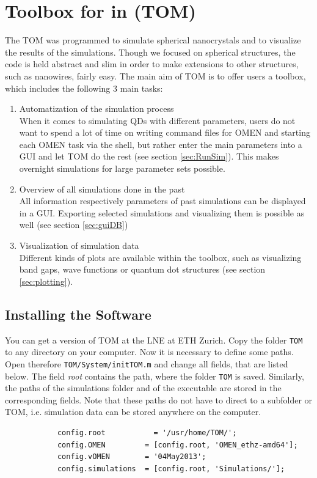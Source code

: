 \chapter{Toolbox for \omen in \matlab (TOM)}

	The \gls{TOM} was programmed to simulate spherical nanocrystals and to visualize the results of the simulations.
	Though we focused on spherical structures, the code is held abstract and slim in order to make extensions to other
	structures, such as nanowires, fairly easy.
	The main aim of \gls{TOM} is to offer \omen users a toolbox, which includes the following 3 main tasks:
	\begin{enumerate}
		\itemsep 0pt
		\item Automatization of the \omen simulation process \\
					When it comes to simulating \glspl{QD} with different parameters, users do not want to spend a lot
					of time on writing command files for OMEN and starting each OMEN task via the shell, but 
					rather enter the main parameters into a \gls{GUI} and let \gls{TOM} do the rest (see section \ref{sec:RunSim}).
					This makes overnight simulations for large parameter sets possible.
		\item Overview of all simulations done in the past	\\
					All information respectively parameters of past simulations can be displayed in a \gls{GUI}. Exporting selected
					simulations and visualizing them is possible as well (see section \ref{sec:guiDB})
		\item Visualization of simulation data	\\
					Different kinds of plots are available within the toolbox, such as visualizing band gaps, wave functions or
					quantum dot structures (see section \ref{sec:plotting}).
	\end{enumerate}

	\section{Installing the Software}
		You can get a version of \gls{TOM} at the \gls{LNE} at {\sc ETH} Zurich. Copy the folder \lstinline{TOM} to any directory on your computer.
		Now it is necessary to define some paths. Open therefore \lstinline{TOM/System/initTOM.m} and change all fields, that are listed below.
		The field {\it root} contains the path, where the folder \lstinline{TOM} is saved. Similarly, the paths of the simulations folder and of the \omen executable are stored in the corresponding fields. Note	that these paths do not have to direct to a subfolder or TOM, i.e. simulation data can be stored anywhere on the computer.
		\begin{lstlisting}
			config.root     	  = '/usr/home/TOM/';
			config.OMEN         = [config.root, 'OMEN_ethz-amd64'];
			config.vOMEN        = '04May2013';
			config.simulations  = [config.root, 'Simulations/'];
		\end{lstlisting}

